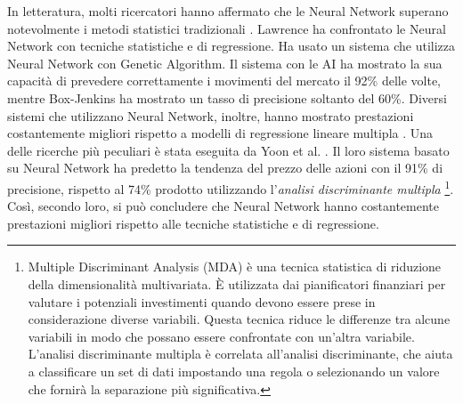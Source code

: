 \documentclass[a4paper,12pt]{report}
\begin{document}
In letteratura, molti ricercatori hanno affermato che le Neural Network superano notevolmente i metodi statistici tradizionali \cite{nng}\cite{nns}. Lawrence \cite{nn1} ha confrontato le Neural Network con tecniche statistiche e di regressione. Ha usato un sistema che utilizza Neural Network con Genetic Algorithm. Il sistema con le AI ha mostrato la sua capacità di prevedere correttamente i movimenti del mercato il 92\% delle volte, mentre Box-Jenkins ha mostrato un tasso di precisione soltanto del 60\%. Diversi sistemi che utilizzano Neural Network, inoltre, hanno mostrato prestazioni costantemente migliori rispetto a modelli di regressione lineare multipla \cite{33} \cite{36}. Una delle ricerche più peculiari è stata eseguita da Yoon et al. \cite{nny}. Il loro sistema basato su Neural Network ha predetto la tendenza del prezzo delle azioni con il 91\% di precisione, rispetto al 74\% prodotto utilizzando l'\textit{analisi discriminante multipla} \footnote{Multiple Discriminant Analysis (MDA) è una tecnica statistica di riduzione della dimensionalità multivariata. È utilizzata dai pianificatori finanziari per valutare i potenziali investimenti quando devono essere prese in considerazione diverse variabili. Questa tecnica riduce le differenze tra alcune variabili in modo che possano essere confrontate con un'altra variabile. L'analisi discriminante multipla è correlata all'analisi discriminante, che aiuta a classificare un set di dati impostando una regola o selezionando un valore che fornirà la separazione più significativa.}. Così, secondo loro, si può concludere che Neural Network hanno costantemente prestazioni migliori rispetto alle tecniche statistiche e di regressione. 
\end{document}
